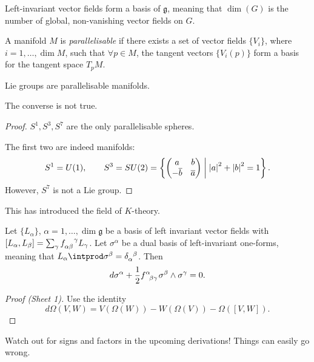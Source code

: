 Left-invariant vector fields form a basis of $\mathfrak{g}$, meaning that $\dim(G)$ is the number of global, non-vanishing vector fields on $G$.
\begin{definition}[parallelisable]
  A manifold $M$  is \emph{parallelisable} if there exists a set of vector fields $\{V_i\}$, where $i = 1, \dots, \dim M$, such that $\forall p \in M$, the tangent vectors $\{V_i(p)\}$ form a basis for the tangent space $T_p M$.
\end{definition}
\begin{claim}
  Lie groups are parallelisable manifolds.
\end{claim}
\begin{claim}
  The converse is not true.
\end{claim}
\begin{proof}
  $S^1, S^3, S^7$  are the only parallelisable spheres.

  The first two are indeed manifolds:
  \begin{equation}
    S^1 = U(1), 
  \qquad S^3 = SU(2) = \left\{ 
    \begin{pmatrix}
     a & b \\
     -\overline{b} & \overline{a} \\
    \end{pmatrix} \suchthat \abs{a}^2 + \abs{b}^2 = 1
  \right\}.
  \end{equation}
  However, $S^7$ is not a Lie group.
\end{proof}
\begin{leftbar}
  This has introduced the field of $K$-theory.
\end{leftbar}

\begin{claim}
  Let $\{L_{\alpha}\}$, $\alpha = 1, \dots, \dim \mathfrak{g}$ be a basis of left invariant vector fields with $ [L_{\alpha}, L_{\beta}] = \sum_\gamma f\indices{_{\alpha\beta}^{\gamma}}L_{\gamma}$.
  Let $\sigma^{\alpha}$ be a dual basis of left-invariant one-forms, meaning that $ L_{\alpha} \intprod \sigma^{\beta} = \delta\indices{_{\alpha}^{\beta}}$.
  Then
  \begin{equation}
    d\sigma^{\alpha} + \frac{1}{2} f\indices{^{\alpha}_{\beta\gamma}} \sigma^{\beta} \wedge \sigma^{\gamma} = 0 \label{eq:4-star}.
  \end{equation}
\end{claim}
\begin{proof}[Proof (Sheet 1)]
  Use the identity
  \begin{equation}
    d \Omega( V, W) = V(\Omega(W)) - W(\Omega(V)) - \Omega([V, W]).
  \end{equation}
\end{proof}
\begin{leftbar}
  Watch out for signs and factors in the upcoming derivations! Things can easily go wrong.
\end{leftbar}

